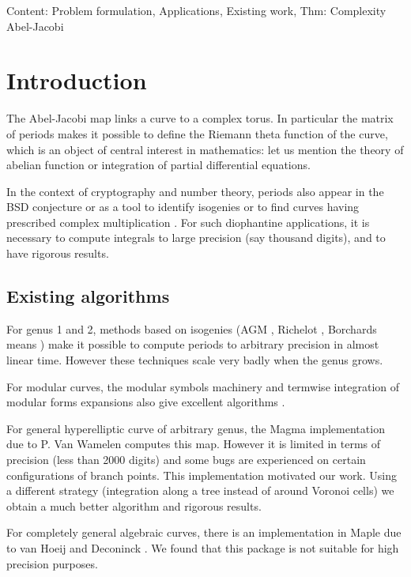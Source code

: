 \documentclass[main.tex]{subfiles}
\begin{document}
  Content: Problem formulation, Applications, Existing work, Thm: Complexity Abel-Jacobi

  \section{Introduction}

  The Abel-Jacobi map links a curve to a complex torus.
  In particular the matrix of periods makes it possible to define the Riemann
  theta function of the curve, which is an object of central interest in
  mathematics: let us
  mention the theory of abelian function or integration of partial differential
  equations.

  In the context of cryptography and number theory, periods also appear
  in the BSD conjecture or as a tool to identify isogenies or to find
  curves having prescribed complex multiplication \cite{vanWamelen06}.
  For such diophantine applications, it is necessary to compute
  integrals to large precision (say thousand digits), and to have
  rigorous results.

  \subsection{Existing algorithms}

  For genus 1 and 2, methods based on isogenies (AGM \cite{CremonaAGM13},
  Richelot \cite{BostMestre88}, Borchards means \cite{Labrande16})
  make it possible to compute periods to arbitrary precision in almost
  linear time. However these techniques scale very badly when the genus grows.

  For modular curves, the modular symbols machinery and termwise integration of
  modular forms expansions also give excellent algorithms
  \cite[sec 3.2]{Mascot13}.

  For general hyperelliptic curve of arbitrary genus, the Magma implementation
  due to P. Van Wamelen \cite{vanWamelen06} computes this map.
  However it is limited in terms of precision (less
  than 2000 digits) and some bugs are experienced on
  certain configurations of branch points. This implementation motivated our
  work. Using a different strategy
  (integration along a tree instead of around Voronoi cells)
  we obtain a much better algorithm and rigorous results.

  For completely general algebraic curves, there is an implementation in Maple
  due to van Hoeij and Deconinck \cite{DeconinckvanHoeij01}.
  We found that this package is not suitable for high precision purposes.
\end{document}
